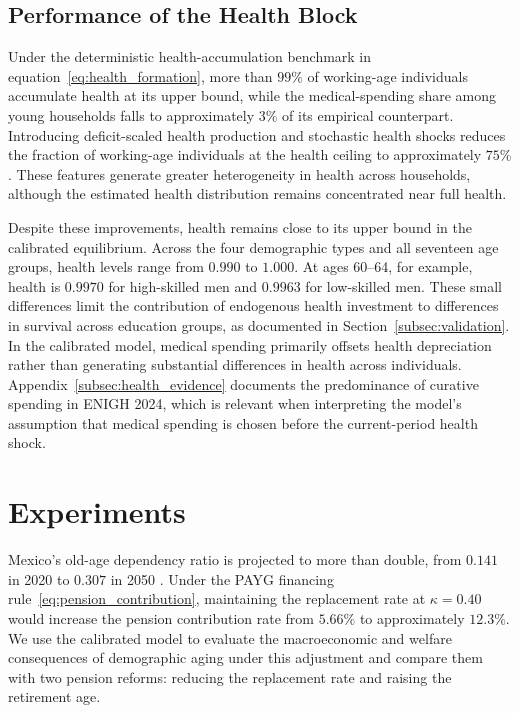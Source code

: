 \documentclass[12pt,a4paper]{article}
\begin{document}
\subsection{Performance of the Health Block}
\label{subsec:health_block_evidence}

Under the deterministic health-accumulation benchmark in equation~\eqref{eq:health_formation}, more than $99\%$ of working-age individuals accumulate health at its upper bound, while the medical-spending share among young households falls to approximately $3\%$ of its empirical counterpart. Introducing deficit-scaled health production and stochastic health shocks reduces the fraction of working-age individuals at the health ceiling to approximately $75\%$. These features generate greater heterogeneity in health across households, although the estimated health distribution remains concentrated near full health.

Despite these improvements, health remains close to its upper bound in the calibrated equilibrium. Across the four demographic types and all seventeen age groups, health levels range from $0.990$ to $1.000$. At ages 60--64, for example, health is $0.9970$ for high-skilled men and $0.9963$ for low-skilled men. These small differences limit the contribution of endogenous health investment to differences in survival across education groups, as documented in Section~\ref{subsec:validation}. In the calibrated model, medical spending primarily offsets health depreciation rather than generating substantial differences in health across individuals. Appendix~\ref{subsec:health_evidence} documents the predominance of curative spending in ENIGH 2024, which is relevant when interpreting the model's assumption that medical spending is chosen before the current-period health shock.


\section{Experiments}
\label{sec:experiments}

Mexico's old-age dependency ratio is projected to more than double, from $0.141$ in 2020 to $0.307$ in 2050 \citep{CONAPO2023}. Under the PAYG financing rule~\eqref{eq:pension_contribution}, maintaining the replacement rate at $\kappa=0.40$ would increase the pension contribution rate from $5.66\%$ to approximately $12.3\%$. We use the calibrated model to evaluate the macroeconomic and welfare consequences of demographic aging under this adjustment and compare them with two pension reforms: reducing the replacement rate and raising the retirement age.
\end{document}
